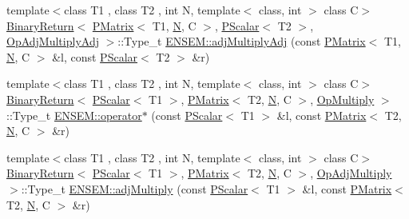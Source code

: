 \begin{DoxyCompactItemize}
\item 
{\footnotesize template$<$class T1 , class T2 , int N, template$<$ class, int $>$ class C$>$ }\\\mbox{\hyperlink{structENSEM_1_1BinaryReturn}{Binary\+Return}}$<$ \mbox{\hyperlink{classENSEM_1_1PMatrix}{P\+Matrix}}$<$ T1, \mbox{\hyperlink{operator__name__util_8cc_a7722c8ecbb62d99aee7ce68b1752f337}{N}}, C $>$, \mbox{\hyperlink{classENSEM_1_1PScalar}{P\+Scalar}}$<$ T2 $>$, \mbox{\hyperlink{structENSEM_1_1OpAdjMultiplyAdj}{Op\+Adj\+Multiply\+Adj}} $>$\+::Type\+\_\+t \mbox{\hyperlink{group__primmatrix_gada4da32758440b83d445ae4a0e14297e}{E\+N\+S\+E\+M\+::adj\+Multiply\+Adj}} (const \mbox{\hyperlink{classENSEM_1_1PMatrix}{P\+Matrix}}$<$ T1, \mbox{\hyperlink{operator__name__util_8cc_a7722c8ecbb62d99aee7ce68b1752f337}{N}}, C $>$ \&l, const \mbox{\hyperlink{classENSEM_1_1PScalar}{P\+Scalar}}$<$ T2 $>$ \&r)
\item 
{\footnotesize template$<$class T1 , class T2 , int N, template$<$ class, int $>$ class C$>$ }\\\mbox{\hyperlink{structENSEM_1_1BinaryReturn}{Binary\+Return}}$<$ \mbox{\hyperlink{classENSEM_1_1PScalar}{P\+Scalar}}$<$ T1 $>$, \mbox{\hyperlink{classENSEM_1_1PMatrix}{P\+Matrix}}$<$ T2, \mbox{\hyperlink{operator__name__util_8cc_a7722c8ecbb62d99aee7ce68b1752f337}{N}}, C $>$, \mbox{\hyperlink{structENSEM_1_1OpMultiply}{Op\+Multiply}} $>$\+::Type\+\_\+t \mbox{\hyperlink{group__primmatrix_ga2f9521924540b40d00ad4aa1606bfb22}{E\+N\+S\+E\+M\+::operator$\ast$}} (const \mbox{\hyperlink{classENSEM_1_1PScalar}{P\+Scalar}}$<$ T1 $>$ \&l, const \mbox{\hyperlink{classENSEM_1_1PMatrix}{P\+Matrix}}$<$ T2, \mbox{\hyperlink{operator__name__util_8cc_a7722c8ecbb62d99aee7ce68b1752f337}{N}}, C $>$ \&r)
\item 
{\footnotesize template$<$class T1 , class T2 , int N, template$<$ class, int $>$ class C$>$ }\\\mbox{\hyperlink{structENSEM_1_1BinaryReturn}{Binary\+Return}}$<$ \mbox{\hyperlink{classENSEM_1_1PScalar}{P\+Scalar}}$<$ T1 $>$, \mbox{\hyperlink{classENSEM_1_1PMatrix}{P\+Matrix}}$<$ T2, \mbox{\hyperlink{operator__name__util_8cc_a7722c8ecbb62d99aee7ce68b1752f337}{N}}, C $>$, \mbox{\hyperlink{structENSEM_1_1OpAdjMultiply}{Op\+Adj\+Multiply}} $>$\+::Type\+\_\+t \mbox{\hyperlink{group__primmatrix_ga01de3db0f09195f592339c9241bd4692}{E\+N\+S\+E\+M\+::adj\+Multiply}} (const \mbox{\hyperlink{classENSEM_1_1PScalar}{P\+Scalar}}$<$ T1 $>$ \&l, const \mbox{\hyperlink{classENSEM_1_1PMatrix}{P\+Matrix}}$<$ T2, \mbox{\hyperlink{operator__name__util_8cc_a7722c8ecbb62d99aee7ce68b1752f337}{N}}, C $>$ \&r)

\end{DoxyCompactItemize}
